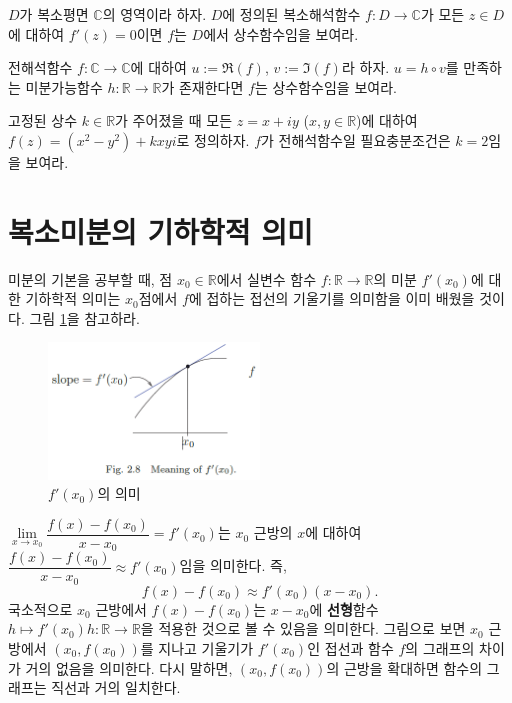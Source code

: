 \begin{salt_exercise} \label{ex-2-13}
$D$가 복소평면 $\mathbb C$의 영역이라 하자.
$D$에 정의된 복소해석함수 $f:D\to\mathbb C$가 
모든  $z\in D$에 대하여 $f'(z)=0$이면
$f$는 $D$에서 상수함수임을 보여라.
\end{salt_exercise}

\begin{salt_exercise} \label{ex-2-14}
전해석함수 $f:\mathbb C \to \mathbb C$에 대하여
$u:=\Re(f)$, $v:=\Im(f)$라 하자.
$u= h\circ v$를 만족하는 미분가능함수 $h:\mathbb R \to \mathbb R$가
존재한다면 $f$는 상수함수임을 보여라.
\end{salt_exercise}

\begin{salt_exercise} \label{ex-2-15}
고정된 상수 $k\in\mathbb R$가 주어졌을 때
모든 $z=x+iy$ ($x,y\in \mathbb R$)에 대하여 $f(z)=(x^2-y^2) +kxyi$로 정의하자.
$f$가 전해석함수일 필요충분조건은 $k=2$임을 보여라.
\end{salt_exercise}

\section{복소미분의 기하학적 의미\label{sec-2-3}}

미분의 기본을 공부할 때, 점 $x_0\in\mathbb R$에서 실변수 함수 $f:\mathbb R\to \mathbb R$의 
미분 $f'(x_0)$에 대한 기하학적 의미는 $x_0$점에서 $f$에 접하는 접선의 기울기를 의미함을
이미 배웠을 것이다. 그림 \ref{fig-2-8}을 참고하라.

\begin{figure}[!h]
\begin{center}
\includegraphics[width=0.5\textwidth]{./SaltChapter/fig-2-8}
\end{center}
\caption{$f'(x_0)$의 의미}
\label{fig-2-8}
\end{figure}

$\lim\limits_{x\to x_0} \dfrac{f(x) - f(x_0)}{x-x_0} = f'(x_0)$는
$x_0$ 근방의 $x$에 대하여
$\dfrac{f(x) - f(x_0)}{x-x_0} \approx f'(x_0)$임을 의미한다. 즉,
\[
f(x) - f(x_0) \approx f'(x_0)(x-x_0).
\]
국소적으로 $x_0$ 근방에서 $f(x)-f(x_0)$는 $x-x_0$에 {\bf 선형}함수 
$h \mapsto f'(x_0)h : \mathbb R \to \mathbb R$을 적용한 것으로 볼 수 있음을 의미한다.
그림으로 보면 $x_0$ 근방에서 
$(x_0, f(x_0))$를 지나고 기울기가 $f'(x_0)$인 접선과 함수 $f$의 그래프의 차이가 거의 없음을 
의미한다. 
다시 말하면, $(x_0, f(x_0))$의 근방을 확대하면   함수의 그래프는 직선과 거의 일치한다.

